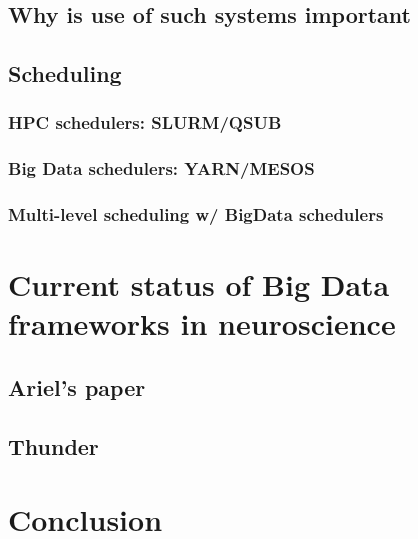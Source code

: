 \documentclass{report}
\begin{document}
	\section{Why is use of such systems important}
	\section{Scheduling}
		\subsection{HPC schedulers: SLURM/QSUB}
		\subsection{Big Data schedulers: YARN/MESOS}
		\subsection{Multi-level scheduling w/ BigData schedulers}
\chapter{Current status of Big Data frameworks in neuroscience}
	\section{Ariel's paper}
	\section{Thunder}
\chapter{Conclusion}





\end{document}
